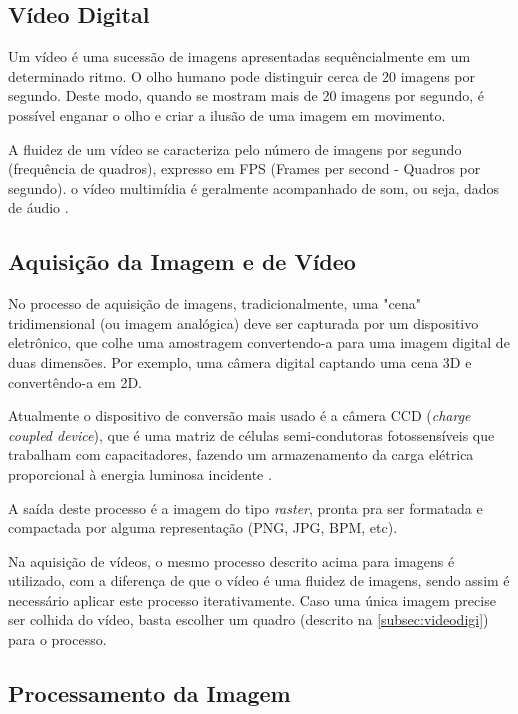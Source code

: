  \subsection{Vídeo Digital}\label{subsec:videodigi}
 
 Um vídeo é uma sucessão de imagens apresentadas sequêncialmente em um determinado ritmo. O olho humano pode distinguir cerca de 20 imagens por segundo. Deste modo, quando se mostram mais de 20 imagens por segundo, é possível enganar o olho e criar a ilusão de uma imagem em movimento. 
 
 A fluidez de um vídeo se caracteriza pelo número de imagens por segundo (frequência de quadros), expresso em FPS (Frames per second - Quadros por segundo). o vídeo multimídia é geralmente acompanhado de som, ou seja, dados de áudio \cite{ccm_video_digi}.

\subsection{Aquisição da Imagem e de Vídeo}\label{subsec:aquisicao_video}

No processo de aquisição de imagens, tradicionalmente, uma "cena" tridimensional (ou imagem analógica) deve ser capturada por um dispositivo eletrônico, que colhe uma amostragem convertendo-a para uma imagem digital de duas dimensões. Por exemplo, uma câmera digital captando uma cena 3D e convertêndo-a em 2D.

Atualmente o dispositivo de conversão mais usado  é a câmera CCD (\textit{charge coupled device}), que é uma matriz de células semi-condutoras fotossensíveis que trabalham com capacitadores, fazendo um armazenamento da carga elétrica proporcional à energia luminosa incidente \cite{gonzalez_woods}.

A saída deste processo é a imagem do tipo \textit{raster}, pronta pra ser formatada e compactada por alguma representação (PNG, JPG, BPM, etc). 


Na aquisição de vídeos, o mesmo processo descrito acima para imagens é utilizado, com a diferença de que o vídeo é uma fluidez de imagens, sendo assim é necessário aplicar este processo iterativamente. Caso uma única imagem precise ser colhida do vídeo, basta escolher um quadro (descrito na \autoref{subsec:videodigi}) para o processo.

\subsection{Processamento da Imagem}\label{subsec:processamento}

